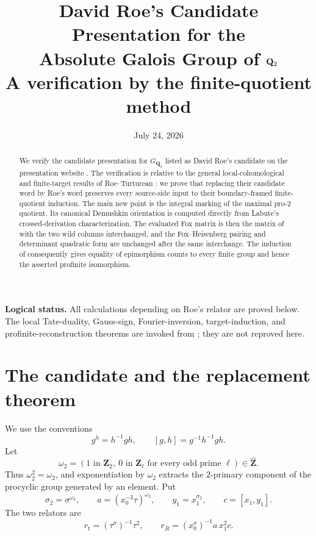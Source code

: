 \documentclass[11pt]{article}
\title{\vspace{-2.5em}
  \textbf{David Roe's Candidate Presentation for the\\
  Absolute Galois Group of \(\Q_2\)}\\[0.45em]
  \large A verification by the finite-quotient method}
\author{}
\date{July 24, 2026}
\numberwithin{equation}{section}
\theoremstyle{definition}
\theoremstyle{remark}
\newcommand{\Q}{\mathbf Q}
\newcommand{\Z}{\mathbf Z}
\newcommand{\rt}{r_{\mathrm t}}
\newcommand{\rR}{r_R}
\newcommand{\omegaTwo}{\omega_2}
\begin{document}
\maketitle
\vspace{-2.4em}

\begin{abstract}
We verify the candidate presentation for \(G_{\Q_2}\) listed as David Roe's
candidate on the presentation website \cite{Presentations}.  The verification
is relative to the general local-cohomological and finite-target results of
Roe--Turturean \cite{RT}: we prove that replacing their candidate word by
Roe's word preserves every source-side input to their boundary-framed
finite-quotient induction.  The main new point is the integral marking of the
maximal pro-\(2\) quotient.  Its canonical Demushkin orientation is computed
directly from Labute's crossed-derivation characterization.  The evaluated
Fox matrix is then the matrix of \cite[\S5]{RT} with the two wild columns
interchanged, and the Fox--Heisenberg pairing and determinant quadratic form
are unchanged after the same interchange.  The induction of
\cite[\S\S7--10]{RT} consequently gives equality of epimorphism counts to
every finite group and hence the asserted profinite isomorphism.
\end{abstract}

\begin{center}
\small\color{muted}
\textbf{Logical status.}
All calculations depending on Roe's relator are proved below.
The local Tate-duality, Gauss-sign, Fourier-inversion, target-induction, and
profinite-reconstruction theorems are invoked from \cite{RT}; they are not
reproved here.
\end{center}

\tableofcontents

\section{The candidate and the replacement theorem}

We use the conventions
\[
  g^h=h^{-1}gh,\qquad [g,h]=g^{-1}h^{-1}gh.
\]
Let
\[
  \omegaTwo=(1\text{ in }\Z_2,\ 0\text{ in }\Z_\ell
  \text{ for every odd prime }\ell)\in\widehat{\Z}.
\]
Thus \(\omegaTwo^2=\omegaTwo\), and exponentiation by \(\omegaTwo\) extracts
the \(2\)-primary component of the procyclic group generated by an element.
Put
\begin{equation}\label{eq:defwords}
  \sigma_2=\sigma^{\omegaTwo},\qquad
  a=(x_0^{-3}\tau)^{\omegaTwo},\qquad
  y_1=x_1^{\sigma_2},\qquad
  c=[x_1,y_1].
\end{equation}
The two relators are
\begin{equation}\label{eq:relators}
  \rt=(\tau^\sigma)^{-1}\tau^2,\qquad
  \rR=(x_0^\sigma)^{-1}a\,x_1^2c.
\end{equation}
\end{document}
